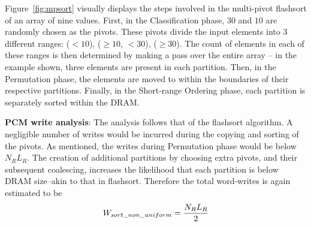 %

Figure~\ref{fig:mpsort} visually displays the steps involved in the multi-pivot
flashsort of an array of nine values. First, in the Classification phase, $30$
and $10$ are randomly chosen as the pivots. These pivots divide the input
elements into 3 different ranges: ($< 10$), ($\geq 10$, $< 30$), ($\geq 30$).
The count of elements in each of these ranges is then determined by making a
pass over the entire array -- in the example shown, three elements are present
in each partition.  Then, in the Permutation phase, the elements are moved to
within the boundaries of their respective partitions. Finally, in the
Short-range Ordering phase, each partition is separately sorted within the
DRAM.

%  	
%	

\textbf{PCM write analysis}: The analysis follows that of the flashsort
algorithm. A negligible number of writes would be incurred during the copying and
sorting of the pivots. As mentioned, the writes during Permutation phase would 
be below $N_R L_R$. The creation of additional partitions by choosing extra
pivots, and their subsequent coalescing, increases the likelihood that each
partition is below DRAM size--akin to that in flashsort. Therefore
the total word-writes is again estimated to be \begin{equation}
\label{eq:mpivot} W_{sort\_non\_uniform} = \frac{N_RL_R}{2} \end{equation}
